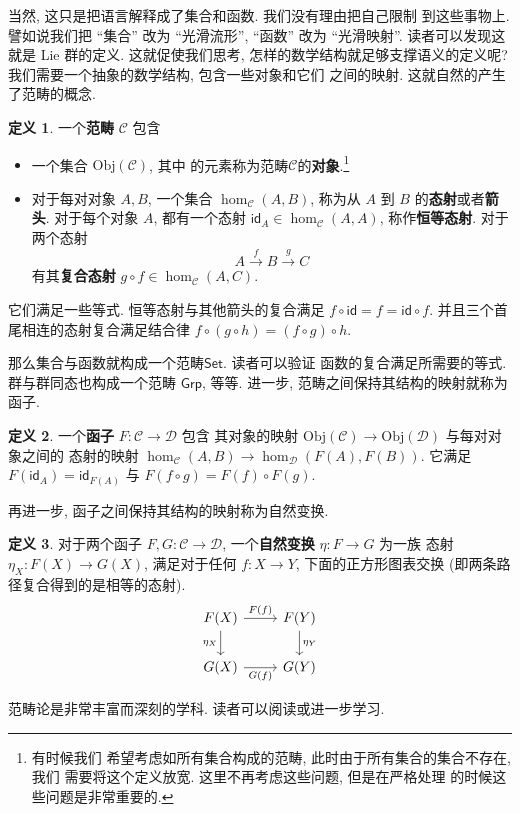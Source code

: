 \documentclass[UTF8]{ctexbook}
\newcommand{\cons}[1]{\textsf{#1}}
\theoremstyle{plain}
\theoremstyle{definition}
\newtheorem{definition}{定义}[chapter]
\theoremstyle{remark}
\begin{document}
当然, 这只是把语言解释成了集合和函数. 我们没有理由把自己限制
到这些事物上. 譬如说我们把 “集合” 改为 “光滑流形”,
“函数” 改为 “光滑映射”. 读者可以发现这就是 Lie 群的定义.
这就促使我们思考, 怎样的数学结构就足够支撑语义的定义呢?
我们需要一个抽象的数学结构, 包含一些对象和它们
之间的映射. 这就自然的产生了范畴的概念.
\begin{definition}
一个\textbf{范畴} \(\mathcal C\) 包含
\begin{itemize}
\item 一个集合 \(\mathrm{Obj}(\mathcal C)\), 其中
的元素称为范畴\(\mathcal C\)的\textbf{对象}.\footnote{有时候我们
希望考虑如所有集合构成的范畴, 此时由于所有集合的集合不存在, 我们
需要将这个定义放宽. 这里不再考虑这些问题, 但是在严格处理
的时候这些问题是非常重要的.}
\item 对于每对对象 \(A,B\), 一个集合 \(\hom_{\mathcal C}(A,B)\),
称为从 \(A\) 到 \(B\) 的\textbf{态射}或者\textbf{箭头}.
对于每个对象 \(A\), 都有一个态射
\(\cons{id}_A \in \hom_{\mathcal C}(A,A)\), 称作\textbf{恒等态射}. 对于两个态射
\[A \xrightarrow f B \xrightarrow g C\]
有其\textbf{复合态射} \(g\circ f \in \hom_{\mathcal C}(A, C)\).
\end{itemize}
它们满足一些等式. 恒等态射与其他箭头的复合满足
\(f \circ \cons{id} = f = \cons{id} \circ f.\)
并且三个首尾相连的态射复合满足结合律
\(f\circ (g\circ h) = (f\circ g)\circ h.\)
\end{definition}

那么集合与函数就构成一个范畴\(\cons{Set}\). 读者可以验证
函数的复合满足所需要的等式. 群与群同态也构成一个范畴 \(\cons{Grp}\),
等等. 进一步, 范畴之间保持其结构的映射就称为函子.
\begin{definition}
一个\textbf{函子} \(F : \mathcal C \to \mathcal D\) 包含
其对象的映射 \(\mathrm{Obj}(\mathcal C)
\to \mathrm{Obj}(\mathcal D)\) 与每对对象之间的
态射的映射 \(\hom_{\mathcal C}(A,B) \to \hom_{\mathcal D}(F(A), F(B))\).
它满足 \(F(\cons{id}_A) = \cons{id}_{F(A)}\) 与
\(F(f \circ g) = F(f)\circ F(g)\).
\end{definition}
再进一步, 函子之间保持其结构的映射称为自然变换.
\begin{definition}
对于两个函子 \(F,G : \mathcal C \to\mathcal D\),
一个\textbf{自然变换} \(\eta : F \to G\) 为一族
态射 \(\eta_X : F(X) \to G(X)\), 满足对于任何
\(f : X \to Y\), 下面的正方形图表交换 (即两条路径复合得到的是相等的态射).
\[\begin{tikzcd}
{F(X)} & {F(Y)} \\
{G(X)} & {G(Y)}
\arrow["{\eta_X}"', from=1-1, to=2-1]
\arrow["{\eta_Y}", from=1-2, to=2-2]
\arrow["{F(f)}", from=1-1, to=1-2]
\arrow["{G(f)}"', from=2-1, to=2-2]
\end{tikzcd}\]
\end{definition}
范畴论是非常丰富而深刻的学科.
读者可以阅读\cite{smith:2018:category}或\cite{maclane:1971:category}进一步学习.
\end{document}
